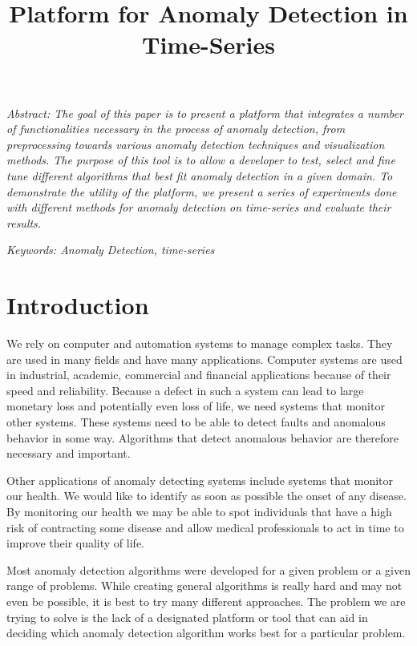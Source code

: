 \documentclass[a4paper, 10pt]{article}
\title{\huge Platform for Anomaly Detection in Time-Series}
\begin{document}
\maketitle

\noindent \hrulefill

\small
\textit{
Abstract: The goal of this paper is to present a platform that integrates a number of functionalities necessary in the process of anomaly detection, from preprocessing towards various anomaly detection techniques and visualization methods. The purpose of this tool is to allow a developer to test, select and fine tune different algorithms that best fit anomaly detection in a given domain. To demonstrate the utility of the platform, we present a series of experiments done with different methods for anomaly detection on time-series and evaluate their results.
}

\noindent \hrulefill

\textit{
Keywords: Anomaly Detection, time-series
}

\normalsize

\section{Introduction}

We rely on computer and automation systems to manage complex tasks. They are used in many fields and have many applications. Computer systems are used in industrial, academic, commercial and financial applications because of their speed and reliability. Because a defect in such a system can lead to large monetary loss and potentially even loss of life, we need systems that monitor other systems. These systems need to be able to detect faults and anomalous behavior in some way. Algorithms that detect anomalous behavior are therefore necessary and important.

Other applications of anomaly detecting systems include systems that monitor our health. We would like to identify as soon as possible the onset of any disease. By monitoring our health we may be able to spot individuals that have a high risk of contracting some disease and allow medical professionals to act in time to improve their quality of life.

Most anomaly detection algorithms were developed for a given problem or a given range of problems. While creating general algorithms is really hard and may not even be possible, it is best to try many different approaches. The problem we are trying to solve is the lack of a designated platform or tool that can aid in deciding which anomaly detection algorithm works best for a particular problem.
\end{document}
